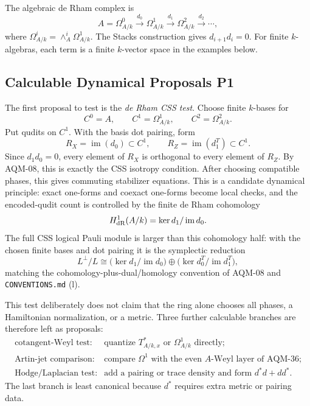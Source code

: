 The algebraic de Rham complex is
\[
  A=\Omega^0_{A/k}\xrightarrow{d_0}\Omega^1_{A/k}
  \xrightarrow{d_1}\Omega^2_{A/k}\xrightarrow{d_2}\cdots,
\]
where \(\Omega^i_{A/k}=\wedge_A^i\Omega^1_{A/k}\).  The Stacks construction
gives \(d_{i+1}d_i=0\).  For finite \(k\)-algebras, each term is a finite
\(k\)-vector space in the examples below.

\subsection{Calculable Dynamical Proposals P1}

The first proposal to test is the \emph{de Rham CSS test}.  Choose finite
\(k\)-bases for
\[
  C^0=A,\qquad C^1=\Omega^1_{A/k},\qquad C^2=\Omega^2_{A/k}.
\]
Put qudits on \(C^1\).  With the basis dot pairing, form
\[
  R_X=\operatorname{im}(d_0)\subset C^1,\qquad
  R_Z=\operatorname{im}(d_1^T)\subset C^1.
\]
Since \(d_1d_0=0\), every element of \(R_X\) is orthogonal to every element of
\(R_Z\).  By AQM-08, this is exactly the CSS isotropy condition.  After
choosing compatible phases, this gives commuting stabilizer equations.  This is
a candidate dynamical principle: exact one-forms and coexact one-forms become
local checks, and the encoded-qudit count is controlled by the finite de Rham
cohomology
\[
  H^1_{\rm dR}(A/k)=\ker d_1/\operatorname{im}d_0.
\]
The full CSS logical Pauli module is larger than this cohomology half: with the
chosen finite bases and dot pairing it is the symplectic reduction
\[
  L^\perp/L
  \cong
  \bigl(\ker d_1/\operatorname{im}d_0\bigr)
  \oplus
  \bigl(\ker d_0^T/\operatorname{im}d_1^T\bigr),
\]
matching the cohomology-plus-dual/homology convention of AQM-08 and
\texttt{CONVENTIONS.md} (l).

This test deliberately does not claim that the ring alone chooses all phases,
a Hamiltonian normalization, or a metric.  Three further calculable branches
are therefore left as proposals:
\[
\begin{array}{ll}
\text{cotangent-Weyl test:} & \text{quantize }T^*_{A/k,x}\text{ or }
  \Omega^1_{A/k}\text{ directly;}\\
\text{Artin-jet comparison:} & \text{compare }\Omega^1\text{ with the even }
  A\text{-Weyl layer of AQM-36;}\\
\text{Hodge/Laplacian test:} & \text{add a pairing or trace density and form }
  d^*d+dd^*.
\end{array}
\]
The last branch is least canonical because \(d^*\) requires extra metric or
pairing data.

